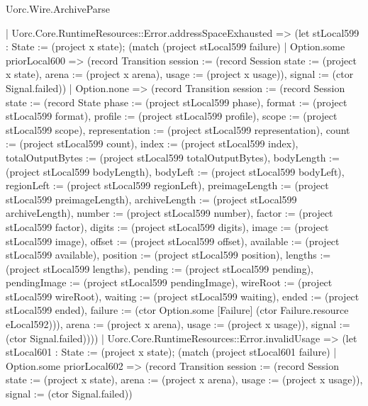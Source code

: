 \begin{lexlean}{Uorc.Wire.ArchiveParse}
\begin{semanticmodule}
{      | Uorc.Core.RuntimeResources::Error.addressSpaceExhausted => (let stLocal599 : State := (project x state); (match (project stLocal599 failure)
        | Option.some priorLocal600 => (record Transition {session := (record Session {state := (project x state), arena := (project x arena), usage := (project x usage)}), signal := (ctor Signal.failed)})
        | Option.none => (record Transition {session := (record Session {state := (record State {phase := (project stLocal599 phase), format := (project stLocal599 format), profile := (project stLocal599 profile), scope := (project stLocal599 scope), representation := (project stLocal599 representation), count := (project stLocal599 count), index := (project stLocal599 index), totalOutputBytes := (project stLocal599 totalOutputBytes), bodyLength := (project stLocal599 bodyLength), bodyLeft := (project stLocal599 bodyLeft), regionLeft := (project stLocal599 regionLeft), preimageLength := (project stLocal599 preimageLength), archiveLength := (project stLocal599 archiveLength), number := (project stLocal599 number), factor := (project stLocal599 factor), digits := (project stLocal599 digits), image := (project stLocal599 image), offset := (project stLocal599 offset), available := (project stLocal599 available), position := (project stLocal599 position), lengths := (project stLocal599 lengths), pending := (project stLocal599 pending), pendingImage := (project stLocal599 pendingImage), wireRoot := (project stLocal599 wireRoot), waiting := (project stLocal599 waiting), ended := (project stLocal599 ended), failure := (ctor Option.some [Failure] (ctor Failure.resource eLocal592))}), arena := (project x arena), usage := (project x usage)}), signal := (ctor Signal.failed)})))
      | Uorc.Core.RuntimeResources::Error.invalidUsage => (let stLocal601 : State := (project x state); (match (project stLocal601 failure)
        | Option.some priorLocal602 => (record Transition {session := (record Session {state := (project x state), arena := (project x arena), usage := (project x usage)}), signal := (ctor Signal.failed)})
}
\end{semanticmodule}
\end{lexlean}
